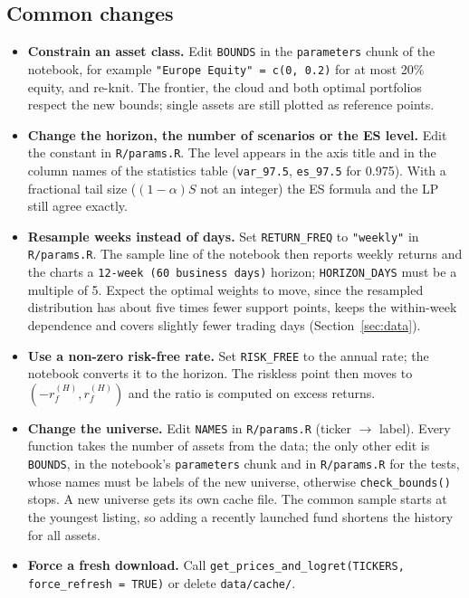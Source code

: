 \documentclass[11pt,a4paper]{article}
\newcommand{\code}[1]{\texttt{#1}}
\newcommand{\file}[1]{\texttt{#1}}
\theoremstyle{plain}
\theoremstyle{remark}
\begin{document}
\subsection{Common changes}

\begin{itemize}[nosep]
  \item \textbf{Constrain an asset class.} Edit \code{BOUNDS} in the
        \code{parameters} chunk of the notebook, for example
        \code{"Europe Equity" = c(0, 0.2)} for at most 20\% equity, and
        re-knit. The frontier, the cloud and both optimal portfolios respect
        the new bounds; single assets are still plotted as reference points.
  \item \textbf{Change the horizon, the number of scenarios or the ES
        level.} Edit the constant in \file{R/params.R}. The level appears in
        the axis title and in the column names of the statistics table
        (\code{var\_97.5}, \code{es\_97.5} for 0.975). With a fractional tail
        size ($(1-\alpha)S$ not an integer) the ES formula and the LP still
        agree exactly.
  \item \textbf{Resample weeks instead of days.} Set \code{RETURN\_FREQ}
        to \code{"weekly"} in \file{R/params.R}. The sample line of the
        notebook then reports weekly returns and the charts a
        \code{12-week (60 business days)} horizon; \code{HORIZON\_DAYS}
        must be a multiple of 5. Expect the optimal weights to move, since
        the resampled distribution has about five times fewer support points,
        keeps the within-week dependence and covers slightly fewer trading
        days (Section~\ref{sec:data}).
  \item \textbf{Use a non-zero risk-free rate.} Set \code{RISK\_FREE} to the
        annual rate; the notebook converts it to the horizon. The riskless
        point then moves to $(-r_f^{(H)}, r_f^{(H)})$ and the ratio is
        computed on excess returns.
  \item \textbf{Change the universe.} Edit \code{NAMES} in \file{R/params.R}
        (ticker $\to$ label). Every function takes the number of assets from
        the data; the only other edit is \code{BOUNDS}, in the notebook's
        \code{parameters} chunk and in \file{R/params.R} for the tests,
        whose names must be labels of the new universe, otherwise
        \code{check\_bounds()} stops. A new universe gets its own cache
        file. The common sample starts at the youngest listing, so adding a
        recently launched fund shortens the history for all assets.
  \item \textbf{Force a fresh download.} Call
        \code{get\_prices\_and\_logret(TICKERS, force\_refresh = TRUE)} or
        delete \file{data/cache/}.
\end{itemize}
\end{document}
